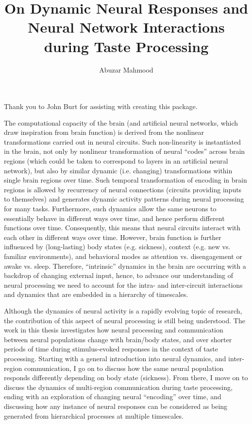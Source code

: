 \documentclass{brandeis-dissertation3.12}
\title{On Dynamic Neural Responses and Neural Network Interactions during Taste Processing}
\author{Abuzar Mahmood}
\begin{document}
\maketitlepage
\makeapproval
\makecopyright

\begin{dissertation-acknowledgements}
Thank you to John Burt for assisting with creating this package.
\end{dissertation-acknowledgements}

\begin{dissertation-abstract}
The computational capacity of the brain (and artificial neural networks, which draw inspiration from brain function) is derived from the nonlinear transformations carried out in neural circuits. Such non-linearity is instantiated in the brain, not only by nonlinear transformation of neural “codes” across brain regions (which could be taken to correspond to layers in an artificial neural network), but also by similar dynamic (i.e. changing) transformations within single brain regions over time. Such temporal transformation of encoding in brain regions is allowed by recurrency of neural connections (circuits providing inputs to themselves) and generates dynamic activity patterns during neural processing for many tasks. Furthermore, such dynamics allow the same neurons to essentially behave in different ways over time, and hence perform different functions over time. Consequently, this means that neural circuits interact with each other in different ways over time. However, brain function is further influenced by (long-lasting) body states (e.g. sickness), context (e.g. new vs. familiar environments), and behavioral modes as attention vs. disengagement or awake vs. sleep. Therefore, “intrinsic” dynamics in the brain are occurring with a backdrop of changing external input, hence, to advance our understanding of neural processing we need to account for the intra- and inter-circuit interactions and dynamics that are embedded in a hierarchy of timescales. 

Although the dynamics of neural activity is a rapidly evolving topic of research, the contribution of this aspect of neural processing is still being understood. The work in this thesis investigates how neural processing and communication between neural populations change with brain/body states, and over shorter periods of time during stimulus-evoked responses in the context of taste processing. Starting with a general introduction into neural dynamics, and inter-region communication, I go on to discuss how the same neural population responds differently depending on body state (sickness). From there, I move on to discuss the dynamics of multi-region communication during taste processing, ending with an exploration of changing neural “encoding” over time, and discussing how any instance of neural responses can be considered as being generated from hierarchical processes at multiple timescales.
\end{dissertation-abstract}

\doublespacing

\tableofcontents


\startbody






\end{document}
